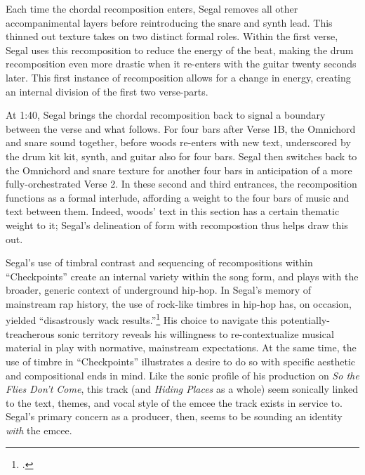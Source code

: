 Each time the chordal recomposition enters, Segal removes all other accompanimental layers
before reintroducing the snare and synth lead. This thinned out texture takes on two distinct 
formal roles. Within the first verse, Segal uses this recomposition to reduce the energy of the 
beat, making the drum recomposition even more drastic when it re-enters with the guitar twenty 
seconds later. This first instance of recomposition allows for a change in energy, creating an 
internal division of the first two verse-parts.

At 1:40, Segal brings the chordal recomposition back to signal a boundary between the verse and 
what follows. For four bars after Verse 1B, the Omnichord and snare sound together, before woods 
re-enters with new text, underscored by the drum kit kit, synth, and guitar also for four bars. 
Segal then switches back to the Omnichord and snare texture for another four bars in anticipation 
of a more fully-orchestrated Verse 2. In these second and third entrances, the recomposition functions
as a formal interlude, affording a weight to the four bars of music and text between them. Indeed, 
woods' text in this section has a certain thematic weight to it; Segal's delineation of form with
recompostion thus helps draw this out.

Segal's use of timbral contrast and sequencing of recompositions within ``Checkpoints'' create
an internal variety within the song form, and plays with the broader, generic context of underground
hip-hop. In Segal's memory of mainstream rap history, the use of rock-like timbres in hip-hop has, 
on occasion, yielded ``disastrously wack results.''\footnote{\cite{backwoodzhiphopKennySegalPresents2019}.}
His choice to navigate this potentially-treacherous sonic territory reveals his willingness to
re-contextualize musical material in play with normative, mainstream expectations. At the same 
time, the use of timbre in ``Checkpoints'' illustrates a desire to do so with specific aesthetic
and compositional ends in mind. Like the sonic profile of his production on \textit{So the Flies 
Don't Come}, this track (and \textit{Hiding Places} as a whole) seem sonically linked to the text, 
themes, and vocal style of the emcee the track exists in service to. Segal's primary concern as a 
producer, then, seems to be sounding an identity \emph{with} the emcee.

